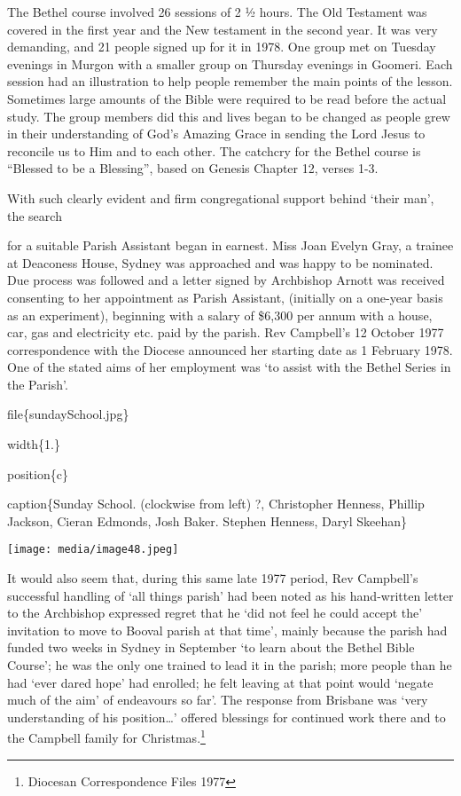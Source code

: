 The Bethel course involved 26 sessions of 2 ½ hours. The Old Testament was covered in the first year and the New testament in the second year. It was very demanding, and 21 people signed up for it in 1978. One group met on Tuesday evenings in Murgon with a smaller group on Thursday evenings in Goomeri. Each session had an illustration to help people remember the main points of the lesson. Sometimes large amounts of the Bible were required to be read before the actual study. The group members did this and lives began to be changed as people grew in their understanding of God's Amazing Grace in sending the Lord Jesus to reconcile us to Him and to each other. The catchcry for the Bethel course is ``Blessed to be a Blessing'', based on Genesis Chapter 12, verses 1-3.

With such clearly evident and firm congregational support behind `their man', the search

for a suitable Parish Assistant began in earnest. Miss Joan Evelyn Gray, a trainee at Deaconess House, Sydney was approached and was happy to be nominated. Due process was followed and a letter signed by Archbishop Arnott was received consenting to her appointment as Parish Assistant, (initially on a one-year basis as an experiment), beginning with a salary of \$6,300 per annum with a house, car, gas and electricity etc. paid by the parish. Rev Campbell's 12 October 1977 correspondence with the Diocese announced her starting date as 1 February 1978. One of the stated aims of her employment was `to assist with the Bethel Series in the Parish'.

file\{sundaySchool.jpg\}

width\{1.\}

position\{c\}

caption\{Sunday School. (clockwise from left) ?, Christopher Henness, Phillip Jackson, Cieran Edmonds, Josh Baker. Stephen Henness, Daryl Skeehan\}

\texttt{[image: media/image48.jpeg]}

It would also seem that, during this same late 1977 period, Rev Campbell's successful handling of `all things parish' had been noted as his hand-written letter to the Archbishop expressed regret that he `did not feel he could accept the' invitation to move to Booval parish at that time', mainly because the parish had funded two weeks in Sydney in September `to learn about the Bethel Bible Course'; he was the only one trained to lead it in the parish; more people than he had `ever dared hope' had enrolled; he felt leaving at that point would `negate much of the aim' of endeavours so far'. The response from Brisbane was `very understanding of his position\ldots' offered blessings for continued work there and to the Campbell family for Christmas.\footnote{Diocesan Correspondence Files 1977}

